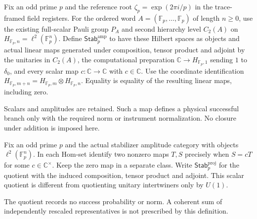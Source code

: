 \begin{definition}
Fix an odd prime $p$ and the reference root
$\zeta_p=\exp(2\pi i/p)$ in the trace-framed field registers. For the
ordered word $A=(\mathbb F_p,\ldots,\mathbb F_p)$ of length $n\geq0$,
use the existing full-scalar Pauli group $P_A$ and second hierarchy level
$C_2(A)$ on $H_{\mathbb F_p,n}=\ell^2(\mathbb F_p^n)$.
Define $\mathsf{Stab}^{\mathrm{amp}}_p$ to have these Hilbert spaces as
objects and actual linear maps generated under composition, tensor product
and adjoint by the unitaries in $C_2(A)$, the computational preparation
$\mathbb C\to H_{\mathbb F_p,1}$ sending $1$ to $\delta_0$, and every
scalar map $c:\mathbb C\to\mathbb C$ with $c\in\mathbb C$.
Use the coordinate identification
$H_{\mathbb F_p,m+n}=H_{\mathbb F_p,m}\otimes H_{\mathbb F_p,n}$.
Equality is equality of the resulting linear maps, including zero.
\end{definition}
\begin{scope}
Scalars and amplitudes are retained. Such a map defines a physical successful branch only with the required norm or instrument normalization. No closure under addition is imposed here.
\end{scope}

\begin{definition}
Fix an odd prime $p$ and the actual stabilizer amplitude category with
objects $\ell^2(\mathbb F_p^n)$. In each Hom-set identify two nonzero
maps $T,S$ precisely when $S=cT$ for some $c\in\mathbb C^\times$.
Keep the zero map in a separate class. Write
$\mathsf{Stab}^{\mathrm{proj}}_p$ for the quotient with the induced
composition, tensor product and adjoint. This scalar quotient is different
from quotienting unitary intertwiners only by $U(1)$.
\end{definition}
\begin{scope}
The quotient records no success probability or norm. A coherent sum of independently rescaled representatives is not prescribed by this definition.
\end{scope}

